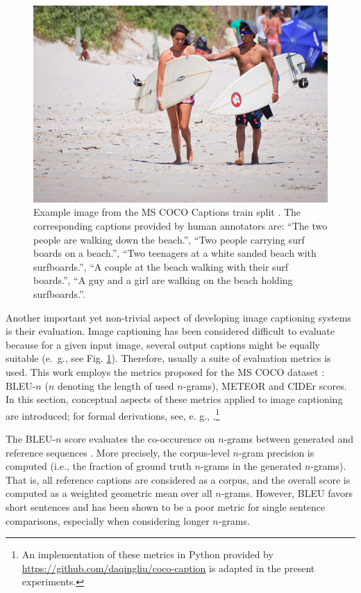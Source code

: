 \begin{figure}
	\centering
	\includegraphics[width=0.7\linewidth]{images/COCO_train2014_example.jpg}
	\caption{Example image from the MS COCO Captions train split \parencite{chen2015microsoft}. The corresponding captions provided by human annotators are: ``The two people are walking down the beach.'', ``Two people carrying surf boards on a beach.'', ``Two teenagers at a white sanded beach with surfboards.'', ``A couple at the beach walking with their surf boards.'', ``A guy and a girl are walking on the beach holding surfboards.''. }
	\label{fig:coco_example}
\end{figure}

Another important yet non-trivial aspect of developing image captioning systems is their evaluation. Image captioning has been considered difficult to evaluate because for a given input image, several output captions might be equally suitable (e.~g., see Fig. \ref{fig:coco_example}). Therefore, usually a suite of evaluation metrics is used. This work employs the metrics proposed for the MS COCO dataset \parencite{chen2015microsoft}: BLEU-$n$ ($n$ denoting the length of used $n$-grams), METEOR and CIDEr scores. In this section, conceptual aspects of these metrics applied to image captioning are introduced; for formal derivations, see, e. g., \cite{chen2015microsoft}.\footnote{An implementation of these metrics in Python provided by \url{https://github.com/daqingliu/coco-caption} is adapted in the present experiments.}

The BLEU-$n$ score evaluates the co-occurence on $n$-grams between generated and reference sequences \parencite{papineni2002bleu}. More precisely, the corpus-level $n$-gram precision is computed (i.e., the fraction of ground truth $n$-grams in the generated $n$-grams). That is, all reference captions are considered as a corpus, and the overall score is computed as a weighted geometric mean over all $n$-grams. However, BLEU favors short sentences and has been shown to be a poor metric for single sentence comparisons, especially when considering longer $n$-grams.

